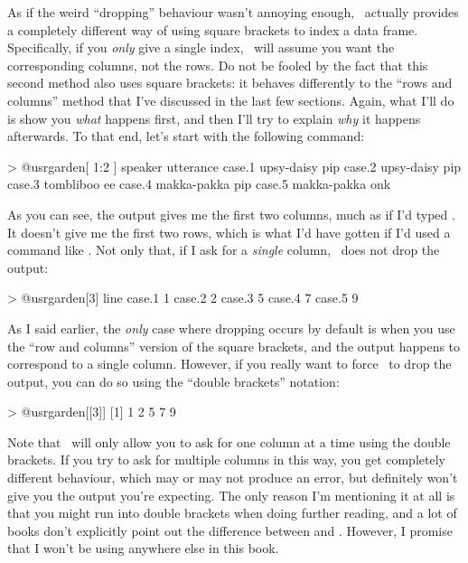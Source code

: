As if the weird ``dropping'' behaviour wasn't annoying enough, \R\ actually provides a completely different way of using square brackets to index a data frame. Specifically, if you {\it only} give a single index, \R\ will assume you want the corresponding columns, not the rows. Do not be fooled by the fact that this second method also uses square brackets: it behaves differently to the ``rows and columns'' method that I've discussed in the last few sections. Again, what I'll do is show you {\it what} happens first, and then I'll try to explain {\it why} it happens afterwards. To that end, let's start with the following command:
\begin{rblock1}
> @usr{garden[ 1:2 ]}
           speaker utterance
case.1  upsy-daisy       pip
case.2  upsy-daisy       pip
case.3   tombliboo        ee
case.4 makka-pakka       pip
case.5 makka-pakka       onk
\end{rblock1}
As you can see, the output gives me the first two columns, much as if I'd typed . It doesn't give me the first two rows, which is what I'd have gotten if I'd used a command like . Not only that, if I ask for a {\it single} column, \R\ does not drop the output:
\begin{rblock1}
> @usr{garden[3]}
       line
case.1    1
case.2    2
case.3    5
case.4    7
case.5    9 
\end{rblock1}
As I said earlier, the {\it only} case where dropping occurs by default is when you use the ``row and columns'' version of the square brackets, and the output happens to correspond to a single column. However, if you really want to force \R\ to drop the output, you can do so using the ``double brackets'' notation:
\begin{rblock1}
> @usr{garden[[3]]}
[1] 1 2 5 7 9
\end{rblock1}
Note that \R\ will only allow you to ask for one column at a time using the double brackets. If you try to ask for multiple columns in this way, you get completely different behaviour, which may or may not produce an error, but definitely won't give you the output you're expecting. The only reason I'm mentioning it at all is that you might run into double brackets when doing further reading, and a lot of books don't explicitly point out the difference between \rtext{[} and \rtext{[[}. However, I promise that I won't be using \rtext{[[} anywhere else in this book. 

